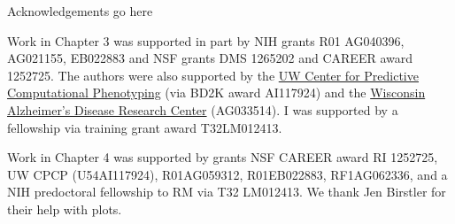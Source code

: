 \begin{acks}
Acknowledgements go here 

Work in Chapter 3 was supported in part by NIH grants R01 AG040396, AG021155, EB022883 
and NSF grants DMS 1265202 and CAREER award 1252725.
The authors were also supported by the \href{http://cpcp.wisc.edu/}{UW Center for Predictive Computational Phenotyping} (via BD2K award AI117924) and the \href{http://www.adrc.wisc.edu/}{Wisconsin Alzheimer's Disease Research Center} (AG033514). 
I was supported by a fellowship via training grant award T32LM012413.

Work in Chapter 4 was supported by grants NSF CAREER award RI 1252725, UW CPCP (U54AI117924), R01AG059312, R01EB022883, RF1AG062336, 
and a NIH predoctoral fellowship to RM via T32 LM012413. We thank Jen Birstler for their help with plots.

\end{acks}
